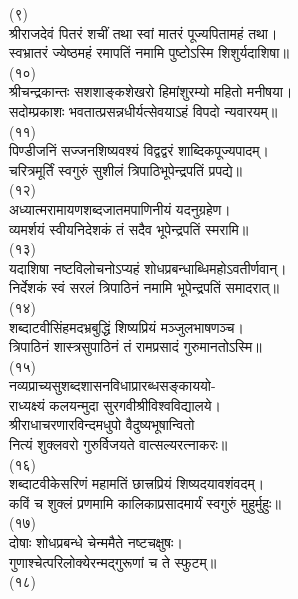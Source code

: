 \begin{center}
(९)\nopagebreak\\
श्रीराजदेवं पितरं शचीं तथा स्वां मातरं पूज्यपितामहं तथा।\nopagebreak\\
स्वभ्रातरं ज्येष्ठमहं रमापतिं नमामि पुष्टोऽस्मि शिशुर्यदाशिषा॥\\
(१०)\nopagebreak\\
श्रीचन्द्रकान्तः सशशाङ्कशेखरो हिमांशुरम्यो महितो मनीषया।\nopagebreak\\
सदोम्प्रकाशः भवतात्प्रसन्नधीर्यत्सेवयाऽहं विपदो न्यवारयम्॥\\
(११)\nopagebreak\\
पिण्डीजनिं सज्जनशिष्यवश्यं विद्वद्वरं शाब्दिकपूज्यपादम्।\nopagebreak\\
चरित्रमूर्तिं स्वगुरुं सुशीलं त्रिपाठिभूपेन्द्रपतिं प्रपद्ये॥\\
(१२)\nopagebreak\\
अध्यात्मरामायणशब्दजातमपाणिनीयं यदनुग्रहेण।\nopagebreak\\
व्यमर्शयं स्वीयनिदेशकं तं सदैव भूपेन्द्रपतिं स्मरामि॥\\
(१३)\nopagebreak\\
यदाशिषा नष्टविलोचनोऽप्यहं शोधप्रबन्धाब्धिमहोऽवतीर्णवान्।\nopagebreak\\
निर्देशकं स्वं सरलं त्रिपाठिनं नमामि भूपेन्द्रपतिं समादरात्॥\\
(१४)\nopagebreak\\
शब्दाटवीसिंहमदभ्रबुद्धिं शिष्यप्रियं मञ्जुलभाषणञ्च।\nopagebreak\\
त्रिपाठिनं शास्त्रसुपाठिनं तं रामप्रसादं गुरुमानतोऽस्मि॥\\
(१५)\nopagebreak\\
नव्यप्राच्यसुशब्दशासनविधाप्रारब्धसङ्काययो-\nopagebreak\\
राध्यक्ष्यं कलयन्मुदा सुरगवीश्रीविश्वविद्यालये।\nopagebreak\\
श्रीराधाचरणारविन्दमधुपो वैदुष्यभूषान्वितो\nopagebreak\\
नित्यं शुक्लवरो गुरुर्विजयते वात्सल्यरत्नाकरः॥\\
(१६)\nopagebreak\\
शब्दाटवीकेसरिणं महामतिं छात्त्रप्रियं शिष्यदयावशंवदम्।\nopagebreak\\
कविं च शुक्लं प्रणमामि कालिकाप्रसादमार्यं स्वगुरुं मुहुर्मुहुः॥\\
(१७)\nopagebreak\\
दोषाः शोधप्रबन्धे चेन्ममैते नष्टचक्षुषः।\nopagebreak\\
गुणाश्चेत्परिलोक्येरन्मद्गुरूणां च ते स्फुटम्॥\\
(१८)\nopagebreak\\

\end{center}
